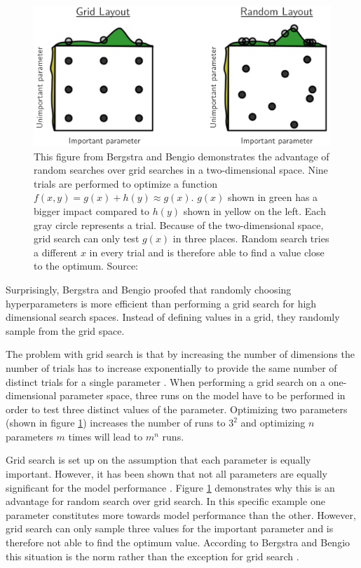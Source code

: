 \begin{figure}[ht]
	\centering
	\includegraphics[scale=0.35]{figures/03_theory/03_randomSearch}
	\caption{This figure from Bergstra and Bengio demonstrates the advantage of random searches over grid searches in a two-dimensional space. Nine trials are performed to optimize a function $f(x, y) = g(x) + h(y) \approx g(x)$. $g(x)$ shown in green has a bigger impact compared to $h(y)$ shown in yellow on the left. Each gray circle represents a trial. Because of the two-dimensional space, grid search can only test $g(x)$ in three places. Random search tries a different $x$ in every trial and is therefore able to find a value close to the optimum. Source: \cite{Bergstra2012a}}
	\label{fig:03_randomSearch}
\end{figure}

Surprisingly, Bergstra and Bengio proofed that randomly choosing hyperparameters is more efficient than performing a grid search \cite{Bergstra2012a} for high dimensional search spaces. Instead of defining values in a grid, they randomly sample from the grid space.

The problem with grid search is that by increasing the number of dimensions the number of trials has to increase exponentially to provide the same number of distinct trials for a single parameter \cite{Bergstra2012a}. When performing a grid search on a one-dimensional parameter space, three runs on the model have to be performed in order to test three distinct values of the parameter. Optimizing two parameters {(shown in figure \ref{fig:03_randomSearch})} increases the number of runs to $3^2$ and optimizing $n$ parameters $m$ times will lead to $m^n$ runs. 

Grid search is set up on the assumption that each parameter is equally important. However, it has been shown that not all parameters are equally significant for the model performance \cite{Bergstra2012a}. Figure \ref{fig:03_randomSearch} demonstrates why this is an advantage for random search over grid search. In this specific example one parameter constitutes more towards model performance than the other. However, grid search can only sample three values for the important parameter and is therefore not able to find the optimum value. According to Bergstra and Bengio this situation is the norm rather than the exception for grid search \cite{Bergstra2012a}.

